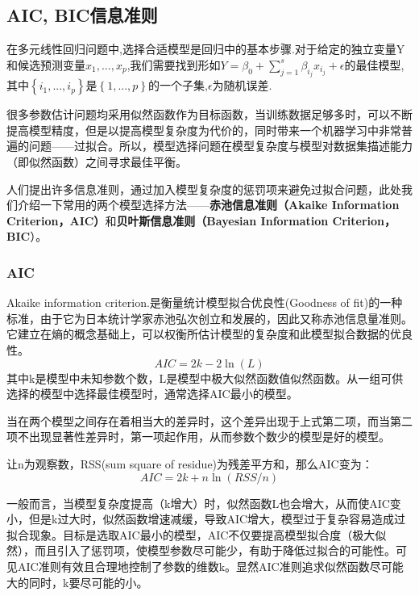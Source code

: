\documentclass[11pt,a4paper,oneside]{book}
\begin{document}
\subsection{AIC, BIC信息准则}
在多元线性回归问题中,选择合适模型是回归中的基本步骤.对于给定的独立变量Y和候选预测变量$ x_1,...,x_p $,我们需要找到形如$ Y=\beta_0+\sum^{s}_{j=1}\beta_{i_j}x_{i_j}+\epsilon $的最佳模型,其中$ \left\lbrace i_1,...,i_p\right\rbrace  $是$ \left\lbrace 1,...,p\right\rbrace  $的一个子集,$ \epsilon $为随机误差.

很多参数估计问题均采用似然函数作为目标函数，当训练数据足够多时，可以不断提高模型精度，但是以提高模型复杂度为代价的，同时带来一个机器学习中非常普遍的问题——过拟合。所以，模型选择问题在模型复杂度与模型对数据集描述能力（即似然函数）之间寻求最佳平衡。

人们提出许多信息准则，通过加入模型复杂度的惩罚项来避免过拟合问题，此处我们介绍一下常用的两个模型选择方法——\textbf{赤池信息准则（Akaike Information Criterion，AIC）}和\textbf{贝叶斯信息准则（Bayesian Information Criterion，BIC}）。
\subsubsection{AIC}
Akaike information criterion.是衡量统计模型拟合优良性(Goodness of fit)的一种标准，由于它为日本统计学家赤池弘次创立和发展的，因此又称赤池信息量准则。它建立在熵的概念基础上，可以权衡所估计模型的复杂度和此模型拟合数据的优良性。
\begin{equation}
AIC=2k-2\ln(L)
\end{equation}
其中k是模型中未知参数个数，L是模型中极大似然函数值似然函数。从一组可供选择的模型中选择最佳模型时，通常选择AIC最小的模型。

当在两个模型之间存在着相当大的差异时，这个差异出现于上式第二项，而当第二项不出现显著性差异时，第一项起作用，从而参数个数少的模型是好的模型。

让n为观察数，RSS(sum square of residue)为残差平方和，那么AIC变为：
\begin{equation}
	AIC=2k+n\ln(RSS/n)
\end{equation}

一般而言，当模型复杂度提高（k增大）时，似然函数L也会增大，从而使AIC变小，但是k过大时，似然函数增速减缓，导致AIC增大，模型过于复杂容易造成过拟合现象。目标是选取AIC最小的模型，AIC不仅要提高模型拟合度（极大似然），而且引入了惩罚项，使模型参数尽可能少，有助于降低过拟合的可能性。可见AIC准则有效且合理地控制了参数的维数k。显然AIC准则追求似然函数尽可能大的同时，k要尽可能的小。
\end{document}
